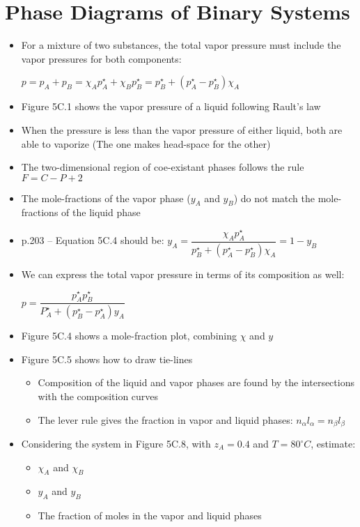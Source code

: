 \documentclass[12pt, openany, letterpaper]{memoir}
\begin{document}
\section{Phase Diagrams of Binary Systems}
\begin{itemize}
	\item For a mixture of two substances, the total vapor pressure must include the vapor pressures for both components:

	      $p = p_A+p_B=\chi_Ap^\star_A+\chi_Bp^\star_B=p^\star_B+\left(p^\star_A-p^\star_B\right)\chi_A$
	\item Figure 5C.1 shows the vapor pressure of a liquid following Rault's law
	\item When the pressure is less than the vapor pressure of either liquid, both are able to vaporize (The one makes head-space for the other)
	\item The two-dimensional region of coe-existant phases follows the rule $F = C - P + 2$
	\item The mole-fractions of the vapor phase ($y_A$ and $y_B$) do not match the mole-fractions of the liquid phase
	\item p.203 -- Equation 5C.4 should be: $y_A = \dfrac{\chi_Ap^\star_A}{p^\star_B+\left(p^\star_A-p^\star_B\right)\chi_A} = 1-y_B$
	\item We can express the total vapor pressure in terms of its composition as well:

	      $p = \dfrac{p^\star_Ap_B^\star}{P_A^\star+\left(p^\star_B-p^\star_A\right)y_A}$
	\item Figure 5C.4 shows a mole-fraction plot, combining $\chi$ and $y$
	\item Figure 5C.5 shows how to draw tie-lines
	      \begin{itemize}
		      \item Composition of the liquid and vapor phases are found by the intersections with the composition curves
		      \item The lever rule gives the fraction in vapor and liquid phases: $n_\alpha l_\alpha=n_\beta l_\beta$
	      \end{itemize}
	\item Considering the system in Figure 5C.8, with $z_A = 0.4$ and $T=80^\circ C$, estimate:
	      \begin{itemize}
		      \item $\chi_A$ and $\chi_B$
		      \item $y_A$ and $y_B$
		      \item The fraction of moles in the vapor and liquid phases
	      \end{itemize}
\end{itemize}
\end{document}
